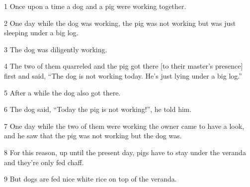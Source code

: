 
1 Once upon a time a dog and a pig were working together.

2 One day while the dog was working, the pig was not working but was just sleeping
under a big log.

3 The dog was diligently working.

4 The two of them quarreled and the pig got there [to their master's presence]
first and said, ``The dog is not working today. He's just lying under a big log.''

5 After a while the dog also got there.

6 The dog said, ``Today the pig is not working!'', he told him.

7 One day while the two of them were working the owner came to have a look, and
he saw that the pig was not working but the dog was.

8 For this reason, up until the present day, pigs have to stay under the veranda
and they're only fed chaff.

9 But dogs are fed nice white rice on top of the veranda.


